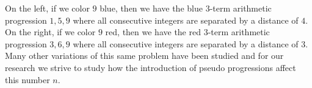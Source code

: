 \documentclass[ fontsize=10pt,twoside]{scrartcl}	%
\newcommand\bicolortext[2][]{%
    \tikz[baseline=(n.base),inner sep=0pt,outer xsep=0pt,#1]{
      \node(n){\phantom{#2}};
      \foreach \a/\c in {north west/bctleft,south east/bctright}{
        \begin{scope}
          \clip(n.south west)--(n.\a)--(n.north east)--cycle;
          \node[\c]at(n){#2};
        \end{scope}
      }}}
\begin{document}
\noindent On the left, if we color $9$ blue, then we have the blue $3$-term arithmetic progression $1,5,9$ where all consecutive integers are separated by a distance of $4$. On the right, if we color $9$ red, then we have the red $3$-term arithmetic progression $3,6,9$ where all consecutive integers are separated by a distance of $3$. Many other variations of this same problem have been studied and for our research we strive to study how the introduction of pseudo progressions affect this number $n$. 

\end{document}
